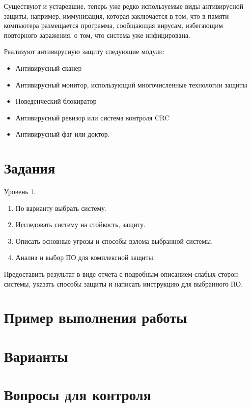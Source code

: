 Существуют и устаревшие, теперь уже редко используемые виды антивирусной
защиты, например, иммунизация, которая заключается в том, что в памяти
компьютера размещается программа, сообщающая вирусам, избегающим повторного
заражения, о том, что система уже инфицирована.

Реализуют антивирусную защиту следующие модули:
\begin{itemize}
  \item Антивирусный сканер
  \item Антивирусный монитор, использующий многочисленные технологии защиты
  \item Поведенческий блокиратор
  \item Антивирусный ревизор или система контроля CRC
  \item Антивирусный фаг или доктор.
\end{itemize}
%
\section{Задания}\label{sect6_b}
%
Уровень 1.
\begin{enumerate}
  \item По варианту выбрать систему.
  \item Исследовать систему на стойкость, защиту.
  \item Описать основные угрозы и способы взлома выбранной системы.
  \item Анализ и выбор ПО для комплексной защиты.
\end{enumerate}
Предоставить результат в виде отчета с подробным описанием слабых сторон
системы, указать способы защиты и написать инструкцию для выбранного ПО.
\section{Пример выполнения работы}\label{sect6_c}
%
\section{Варианты}\label{sect6_d}
%
\section{Вопросы для контроля}\label{sect6_e}
%
